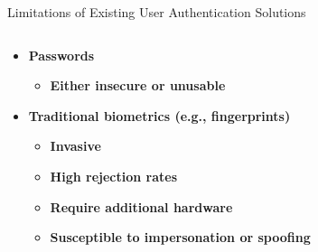 \documentclass[aspectratio=43]{beamer}
\begin{document}
\begin{frame}{Limitations of Existing User Authentication Solutions}

\begin{columns}
    \begin{column}{0.5\textwidth}
        \begin{itemize}
            \item \textbf{Passwords} 
            \begin{itemize}
                \item \textbf{Either insecure or unusable} 
            \end{itemize}
            \item \textbf{Traditional biometrics (e.g., fingerprints)}
            \begin{itemize}
                \item \textbf{Invasive}
                \item \textbf{High rejection rates}
                \item \textbf{Require additional hardware}
                \item \textbf{Susceptible to impersonation or spoofing}
            \end{itemize}
        \end{itemize}
    \end{column}
    \begin{column}{0.48\textwidth}
        \centering 
\end{column}
\end{columns}
\end{frame}
\end{document}
